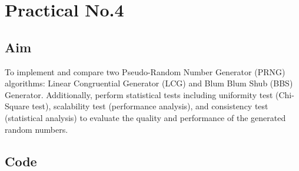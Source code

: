 \documentclass[a4paper,12pt]{article}
\newcommand{\textfont}{\fontsize{12}{14}\selectfont}
\begin{document}
\section*{Practical No.4}
\textfont

\subsection*{Aim}
To implement and compare two Pseudo-Random Number Generator (PRNG) algorithms: Linear Congruential Generator (LCG) and Blum Blum Shub (BBS) Generator. Additionally, perform statistical tests including uniformity test (Chi-Square test), scalability test (performance analysis), and consistency test (statistical analysis) to evaluate the quality and performance of the generated random numbers.

\subsection*{Code}
\end{document}
